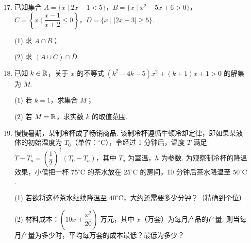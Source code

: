 \documentclass[a4paper,11pt]{article}
\begin{document}
\begin{enumerate}
\setcounter{enumi}{16}

\item 已知集合 $A=\{x\mid 2x-1<5\}$，$B=\{x\mid x^2-5x+6>0\}$，$C=\left\{x\mid\dfrac{x-1}{x+2}\leqslant0\right\}$，$D=\{x\mid\lvert 2x-3\rvert\geqslant5\}$.

(1) 求 $A\cap B$；

(2) 求 $(A\cup C)\cap\overline{D}$.

\ifanswer
\solbegin
{}
\solend
\fi

\item 已知 $k\in\mathbb{R}$，关于 $x$ 的不等式 $(k^2-4k-5)x^2+(k+1)x+1>0$ 的解集为 $M$.

(1) 若 $k=1$，求集合 $M$；

(2) 若 $M=\mathbb{R}$，求实数 $k$ 的取值范围.

\ifanswer
\solbegin
{}
\step{综上，$k$ 的取值范围是 $(-\infty,-1]\cup(7,+\infty)$.}
\solend
\fi

\item 慢慢暑期，某制冷杯成了畅销商品. 该制冷杯遵循牛顿冷却定律，即如果某液体的初始温度为 $T_0$（单位：$^\circ\mathrm{C}$），令经过 1 分钟后，温度 $T$ 满足 $T-T_a=\left(\dfrac12\right)^{\frac th}(T_0-T_a)$，其中 $T_a$ 为室温，$h$ 为参数. 为观察制冷杯的降温效果，小侯把一杯 $75^\circ\mathrm{C}$ 的茶水放在 $25^\circ\mathrm{C}$ 的房间，10 分钟后茶水降温至 $50^\circ\mathrm{C}$.

(1) 若欲将这杯茶水继续降温至 $40^\circ\mathrm{C}$，大约还需要多少分钟？（精确到个位）

(2) 材料成本：$\left(10x+\dfrac{x^2}{20}\right)$ 万元，其中 $x$（万套）为每月产品的产量. 则当每月产量为多少时，平均每万套的成本最低？最低为多少？


\end{enumerate}
\end{document}
